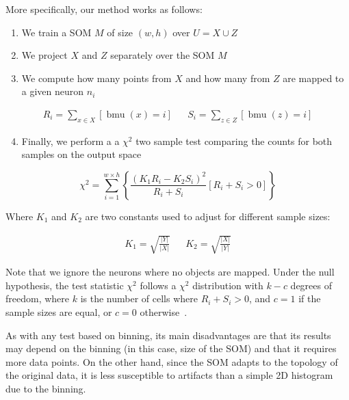 More specifically, our method works as follows:

\begin{enumerate}
    \item We train a \gls{SOM} $M$ of size $(w, h)$ over $U = X \cup Z$
    \item We project $X$ and $Z$ separately over the \gls{SOM}  $M$
    \item We compute how many points from $X$ and how many from $Z$ are mapped to a given neuron $n_i$
\end{enumerate}

\begin{align}
    R_i = \sum_{x \in X} [ \operatorname{bmu}(x) = i ] && S_i = \sum_{z \in Z} [ \operatorname{bmu}(z) = i ]
\end{align}

\begin{enumerate}
    \setcounter{enumi}{3}
    \item Finally, we perform a a $\chi^2$ two sample test comparing the counts for both samples
    on the output space
\end{enumerate}

\begin{equation}
    \label{eq:chi2}
    \chi^2 = \sum_{i=1}^{w \times h}{ \left\{ \frac{(K_1 R_i - K_2 S_i)^2}{R_i + S_i} [ R_i + S_i > 0 ] \right\}}
\end{equation}

Where $K_1$ and $K_2$ are two constants used to adjust for different sample sizes:

\begin{align}
    \label{eq:k1k2} K_1 = \sqrt{\frac{|Y|}{|X|}} && K_2 = \sqrt{\frac{|X|}{|Y|}}
\end{align}

Note that we ignore the neurons where no objects are mapped. Under the null hypothesis,
the test statistic $\chi^2$ follows a $\chi^2$
distribution with $k - c$ degrees of freedom, where $k$ is the number of cells
where ${R_i + S_i > 0}$, and $c = 1$ if the sample sizes are equal, or $c = 0$
otherwise~\cite{press1993numerical}.

As with any test based on binning, its main disadvantages are that its results may
depend on the binning (in this case, size of the \gls{SOM}) and that it requires
more data points.
On the other hand, since the \gls{SOM} adapts to the topology of the
original data, it is less susceptible to artifacts than a simple 2D histogram
due to the binning.

